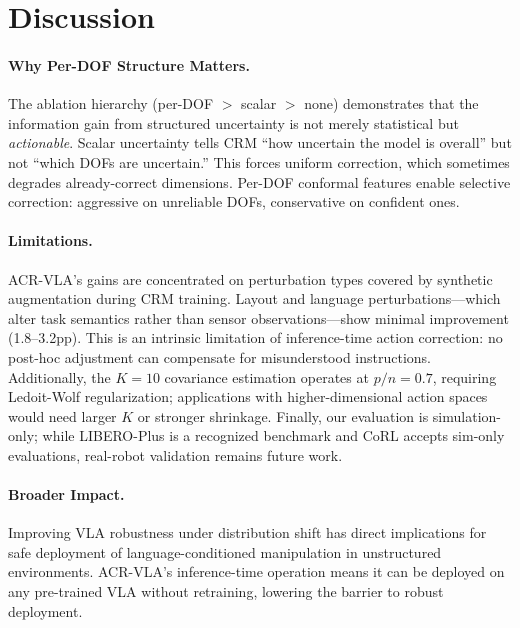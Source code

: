 \documentclass[10pt,letterpaper]{article}
\newcommand{\ours}{ACR-VLA}
\newcommand{\crm}{CRM}
\begin{document}
\section{Discussion}
\label{sec:discussion}

\paragraph{Why Per-DOF Structure Matters.}
The ablation hierarchy (per-DOF $>$ scalar $>$ none) demonstrates that the information gain from structured uncertainty is not merely statistical but \emph{actionable}.
Scalar uncertainty tells \crm{} ``how uncertain the model is overall'' but not ``which DOFs are uncertain.''
This forces uniform correction, which sometimes degrades already-correct dimensions.
Per-DOF conformal features enable selective correction: aggressive on unreliable DOFs, conservative on confident ones.

\paragraph{Limitations.}
\ours{}'s gains are concentrated on perturbation types covered by synthetic augmentation during \crm{} training.
Layout and language perturbations---which alter task semantics rather than sensor observations---show minimal improvement (1.8--3.2pp).
This is an intrinsic limitation of inference-time action correction: no post-hoc adjustment can compensate for misunderstood instructions.
Additionally, the $K{=}10$ covariance estimation operates at $p/n{=}0.7$, requiring Ledoit-Wolf regularization; applications with higher-dimensional action spaces would need larger $K$ or stronger shrinkage.
Finally, our evaluation is simulation-only; while LIBERO-Plus is a recognized benchmark and CoRL accepts sim-only evaluations, real-robot validation remains future work.

\paragraph{Broader Impact.}
Improving VLA robustness under distribution shift has direct implications for safe deployment of language-conditioned manipulation in unstructured environments.
\ours{}'s inference-time operation means it can be deployed on any pre-trained VLA without retraining, lowering the barrier to robust deployment.

\end{document}

